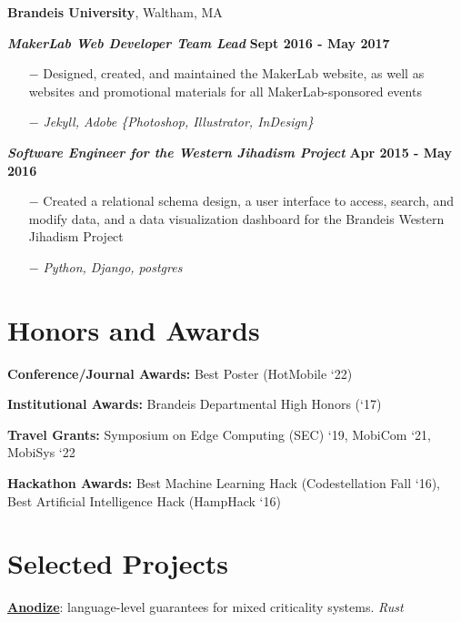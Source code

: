 \documentclass[margin,line]{res}
\begin{document}
\begin{resume}
{\bf Brandeis University}, Waltham, MA

\vspace{-.4cm}
{\bf \em MakerLab Web Developer Team Lead} \hfill {\bf Sept 2016 - May 2017}
\begin{itemize}
  \setlength\itemsep{-.2em} 
  \item[$-$] Designed, created, and maintained the MakerLab website, as well as websites and promotional materials for all MakerLab-sponsored events
  \item[$-$] \textit{Jekyll, Adobe \{Photoshop, Illustrator, InDesign\}}
\end{itemize}

\vspace{-.3cm}
{\bf \em Software Engineer for the Western Jihadism Project} \hfill {\bf Apr 2015 - May 2016}
\begin{itemize}
  \setlength\itemsep{-.2em} 
  \item[$-$] Created a relational schema design, a user interface to access, search, and modify data, and a data visualization dashboard for the Brandeis Western Jihadism Project
    \item[$-$] \textit{Python, Django, postgres}
\end{itemize}

\section{\sc Honors and Awards} 
\textbf{Conference/Journal Awards:} Best Poster (HotMobile `22)

\vspace*{-2.5mm}
\textbf{Institutional Awards:} Brandeis Departmental High Honors (`17)

\vspace*{-2.5mm}
\textbf{Travel Grants:} Symposium on Edge Computing (SEC) `19, MobiCom `21, MobiSys `22

\vspace*{-2.5mm}
\textbf{Hackathon Awards:} Best Machine Learning Hack (Codestellation Fall `16), Best Artificial Intelligence Hack (HampHack `16)

\section{\sc Selected Projects} 
 
  \textbf{\href{https://sofiya.io/projects/anodize.html}{Anodize}}: language-level guarantees for mixed criticality systems. \textit{Rust}


\end{resume}
\end{document}
